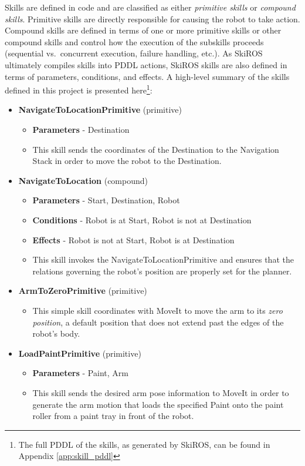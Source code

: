 Skills are defined in code and are classified as either {\it primitive skills} or {\it compound skills}. Primitive skills are directly responsible for causing the robot to take action. Compound skills are defined in terms of one or more primitive skills or other compound skills and control how the execution of the subskills proceeds (sequential vs.~concurrent execution, failure handling, etc.). As SkiROS ultimately compiles skills into PDDL actions, SkiROS skills are also defined in terms of parameters, conditions, and effects. A high-level summary of the skills defined in this project is presented here\footnote{The full PDDL of the skills, as generated by SkiROS, can be found in Appendix \ref{app:skill_pddl}}:
\begin{itemize}
    \item {\bf NavigateToLocationPrimitive} (primitive)
    \begin{itemize}
        \item {\bf Parameters} - Destination
        \item This skill sends the coordinates of the Destination to the Navigation Stack in order to move the robot to the Destination.
    \end{itemize}
    
    \item {\bf NavigateToLocation} (compound)
    \begin{itemize}
        \item {\bf Parameters} - Start, Destination, Robot
        \item {\bf Conditions} - Robot is at Start, Robot is not at Destination
        \item {\bf Effects} - Robot is not at Start, Robot is at Destination
        \item This skill invokes the NavigateToLocationPrimitive and ensures that the relations governing the robot's position are properly set for the planner.
    \end{itemize}
    
    \item {\bf ArmToZeroPrimitive} (primitive)
    \begin{itemize}
        \item This simple skill coordinates with MoveIt to move the arm to its {\it zero position}, a default position that does not extend past the edges of the robot's body.
    \end{itemize}
    
    \item {\bf LoadPaintPrimitive} (primitive)
    \begin{itemize}
        \item {\bf Parameters} - Paint, Arm
        \item This skill sends the desired arm pose information to MoveIt in order to generate the arm motion that loads the specified Paint onto the paint roller from a paint tray in front of the robot.
    \end{itemize}
    

\end{itemize}
